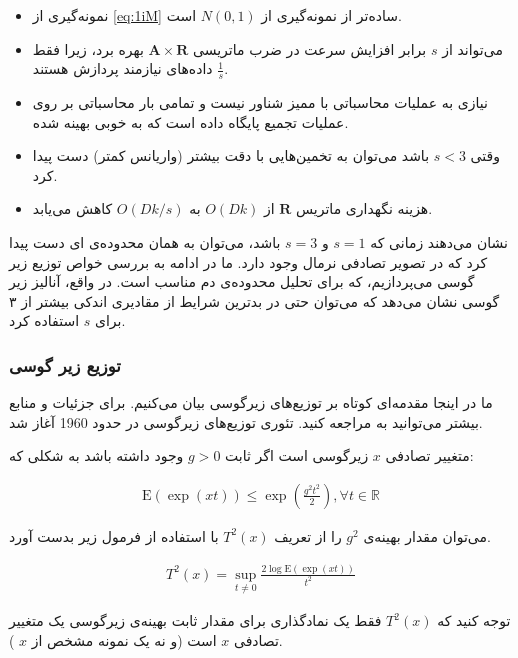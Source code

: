 \begin{itemize}
\item
نمونه‌گیری از 
\autoref{eq:1iM}
ساده‌تر از نمونه‌گیری از
$N(0,1)$
است.
\item
می‌تواند از 
$s$
برابر افزایش سرعت در ضرب ماتریسی 
$\mathbf{A} \times \mathbf{R}$
بهره برد، زیرا فقط
$\frac{1}{s}$
داده‌های نیازمند پردازش هستند.
\item
نیازی به عملیات محاسباتی با ممیز شناور نیست و تمامی بار محاسباتی بر روی عملیات تجمیع پایگاه داده است که به خوبی بهینه شده.
\item
وقتی 
$s<3$
باشد می‌توان به تخمین‌هایی با دقت بیشتر (واریانس کمتر) دست پیدا کرد.
\item
هزینه نگهداری ماتریس 
$\mathbf{R}$
از 
$O(Dk)$
به 
$O(Dk/s)$
کاهش می‌یابد.
\end{itemize}

\cite{litez2, litez3}
نشان ‌می‌دهند زمانی که 
$s=1$
و 
$s=3$
باشد، می‌توان به همان محدوده‌ی 
ای دست پیدا کرد که در تصویر تصادفی نرمال وجود دارد. ما در ادامه به بررسی خواص توزیع زیر گوسی می‌پردازیم، که برای تحلیل محدوده‌ی دم مناسب است. در واقع، آنالیز زیر گوسی نشان می‌دهد که می‌توان حتی در بدترین شرایط از مقادیری اندکی بیشتر از ۳ برای 
$s$
استفاده کرد.

\subsubsection{
توزیع زیر گوسی
}

ما در اینجا مقدمه‌ای کوتاه بر توزیع‌های زیرگوسی بیان می‌کنیم. برای جزئیات و منابع بیشتر می‌توانید به
\cite{litez40}
مراجعه کنید. تئوری توزیع‌های زیرگوسی در حدود 1960 آغاز شد.

متغییر تصادفی 
$x$
زیرگوسی است اگر ثابت 
$g > 0$
وجود داشته باشد به شکلی که:

\begin{align}
\mathrm{E}(\exp (xt)) \leq \exp \left( \frac{g^2 t^2}{2} \right), \forall t \in \mathbb{R}
\label{eq:1iN}
\end{align}

می‌توان مقدار بهینه‌ی 
$g^2$ 
را از تعریف 
$T^2(x)$
با استفاده از فرمول زیر بدست آورد.

\begin{align}
T^2(x) = \sup_{t \neq 0} \frac{2 \log \mathrm{E}\left(\exp(xt)\right)}{t^2}
\label{eq:1iP}
\end{align}

توجه کنید که 
$T^2(x)$
فقط یک نمادگذاری برای مقدار ثابت بهینه‌ی زیرگوسی یک متغییر تصادفی 
$x$
است (و نه یک نمونه مشخص از 
$x$
).

